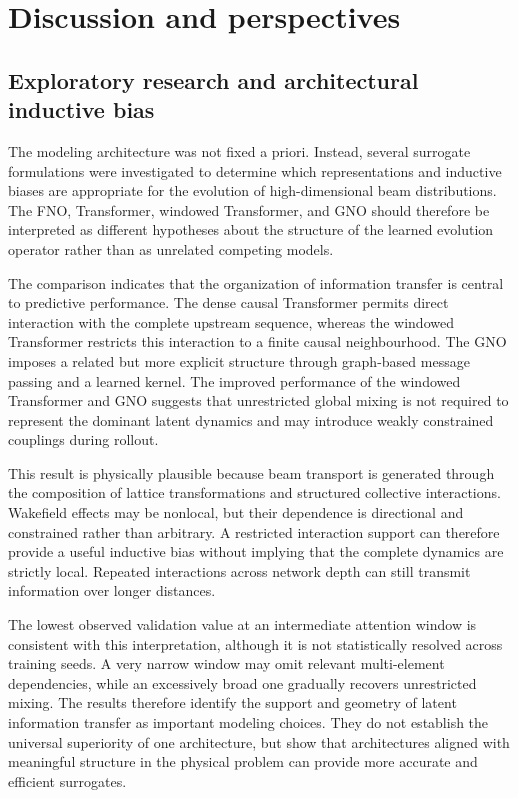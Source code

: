 
\chapter{Discussion and perspectives}
\label{sec:06_discussion_and_perspectives_discussion_and_perspectives}

\section{Exploratory research and architectural inductive bias}
\label{sec:06_discussion_and_perspectives_exploratory_research_and_architectural_inductive_bias}

The modeling architecture was not fixed a priori. Instead, several surrogate formulations were investigated to determine which representations and inductive biases are appropriate for the evolution of high-dimensional beam distributions. The FNO, Transformer, windowed Transformer, and GNO should therefore be interpreted as different hypotheses about the structure of the learned evolution operator rather than as unrelated competing models.

The comparison indicates that the organization of information transfer is central to predictive performance. The dense causal Transformer permits direct interaction with the complete upstream sequence, whereas the windowed Transformer restricts this interaction to a finite causal neighbourhood. The GNO imposes a related but more explicit structure through graph-based message passing and a learned kernel. The improved performance of the windowed Transformer and GNO suggests that unrestricted global mixing is not required to represent the dominant latent dynamics and may introduce weakly constrained couplings during rollout.

This result is physically plausible because beam transport is generated through the composition of lattice transformations and structured collective interactions. Wakefield effects may be nonlocal, but their dependence is directional and constrained rather than arbitrary. A restricted interaction support can therefore provide a useful inductive bias without implying that the complete dynamics are strictly local. Repeated interactions across network depth can still transmit information over longer distances.

The lowest observed validation value at an intermediate attention window is consistent with this interpretation, although it is not statistically resolved across training seeds. A very narrow window may omit relevant multi-element dependencies, while an excessively broad one gradually recovers unrestricted mixing. The results therefore identify the support and geometry of latent information transfer as important modeling choices. They do not establish the universal superiority of one architecture, but show that architectures aligned with meaningful structure in the physical problem can provide more accurate and efficient surrogates.

